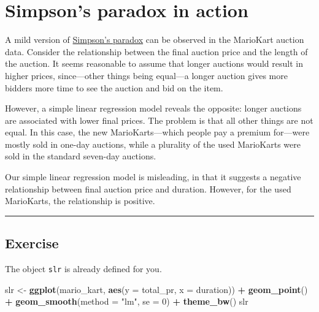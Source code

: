 \documentclass[
]{book}
\newenvironment{Shaded}{\begin{snugshade}}{\end{snugshade}}
\newcommand{\DataTypeTok}[1]{\textcolor[rgb]{0.13,0.29,0.53}{#1}}
\newcommand{\DecValTok}[1]{\textcolor[rgb]{0.00,0.00,0.81}{#1}}
\newcommand{\KeywordTok}[1]{\textcolor[rgb]{0.13,0.29,0.53}{\textbf{#1}}}
\newcommand{\NormalTok}[1]{#1}
\newcommand{\OperatorTok}[1]{\textcolor[rgb]{0.81,0.36,0.00}{\textbf{#1}}}
\newcommand{\StringTok}[1]{\textcolor[rgb]{0.31,0.60,0.02}{#1}}
\begin{document}
\hypertarget{simpsons-paradox-in-action}{%
\section{Simpson's paradox in action}\label{simpsons-paradox-in-action}}

A mild version of \href{https://en.wikipedia.org/wiki/Simpson\%27s_paradox}{Simpson's paradox} can be observed in the MarioKart auction data. Consider the relationship between the final auction price and the length of the auction. It seems reasonable to assume that longer auctions would result in higher prices, since---other things being equal---a longer auction gives more bidders more time to see the auction and bid on the item.

However, a simple linear regression model reveals the opposite: longer auctions are associated with lower final prices. The problem is that all other things are not equal. In this case, the new MarioKarts---which people pay a premium for---were mostly sold in one-day auctions, while a plurality of the used MarioKarts were sold in the standard seven-day auctions.

Our simple linear regression model is misleading, in that it suggests a negative relationship between final auction price and duration. However, for the used MarioKarts, the relationship is positive.

\begin{center}\rule{0.5\linewidth}{0.5pt}\end{center}

\hypertarget{exercise-8}{%
\subsection*{Exercise}\label{exercise-8}}

The object \texttt{slr} is already defined for you.

\begin{Shaded}
\begin{Highlighting}[]
\NormalTok{slr <-}\StringTok{ }\KeywordTok{ggplot}\NormalTok{(mario_kart, }\KeywordTok{aes}\NormalTok{(}\DataTypeTok{y =}\NormalTok{ total_pr, }\DataTypeTok{x =}\NormalTok{ duration)) }\OperatorTok{+}\StringTok{ }
\StringTok{  }\KeywordTok{geom_point}\NormalTok{() }\OperatorTok{+}\StringTok{ }
\StringTok{  }\KeywordTok{geom_smooth}\NormalTok{(}\DataTypeTok{method =} \StringTok{"lm"}\NormalTok{, }\DataTypeTok{se =} \DecValTok{0}\NormalTok{) }\OperatorTok{+}\StringTok{ }
\StringTok{  }\KeywordTok{theme_bw}\NormalTok{()}
\NormalTok{slr}
\end{Highlighting}
\end{Shaded}
\end{document}
